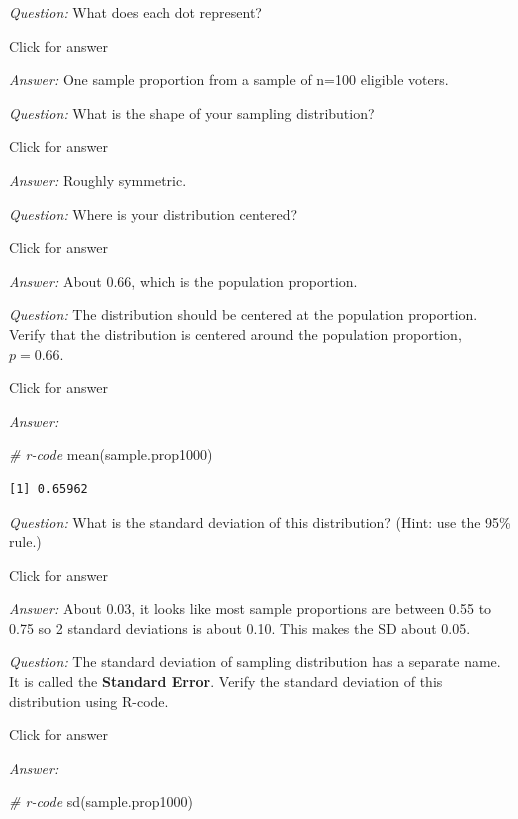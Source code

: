 \documentclass[
]{book}
\newenvironment{Shaded}{\begin{snugshade}}{\end{snugshade}}
\newcommand{\CommentTok}[1]{\textcolor[rgb]{0.56,0.35,0.01}{\textit{#1}}}
\newcommand{\FunctionTok}[1]{\textcolor[rgb]{0.00,0.00,0.00}{#1}}
\newcommand{\NormalTok}[1]{#1}
\begin{document}
\emph{Question:} What does each dot represent?

Click for answer

\emph{Answer:} One sample proportion from a sample of n=100 eligible voters.

\emph{Question:} What is the shape of your sampling distribution?

Click for answer

\emph{Answer:} Roughly symmetric.

\emph{Question:} Where is your distribution centered?

Click for answer

\emph{Answer:} About 0.66, which is the population proportion.

\emph{Question:} The distribution should be centered at the population proportion. Verify that the distribution is centered around the population proportion, \(p = 0.66\).

Click for answer

\emph{Answer:}

\begin{Shaded}
\begin{Highlighting}[]
\CommentTok{\# r{-}code}
\FunctionTok{mean}\NormalTok{(sample.prop1000)}
\end{Highlighting}
\end{Shaded}

\begin{verbatim}
[1] 0.65962
\end{verbatim}

\emph{Question:} What is the standard deviation of this distribution? (Hint: use the 95\% rule.)

Click for answer

\emph{Answer:} About 0.03, it looks like most sample proportions are between 0.55 to 0.75 so 2 standard deviations is about 0.10. This makes the SD about 0.05.

\emph{Question:} The standard deviation of sampling distribution has a separate name. It is called the \textbf{Standard Error}. Verify the standard deviation of this distribution using R-code.

Click for answer

\emph{Answer:}

\begin{Shaded}
\begin{Highlighting}[]
\CommentTok{\# r{-}code}
\FunctionTok{sd}\NormalTok{(sample.prop1000)}
\end{Highlighting}
\end{Shaded}
\end{document}
